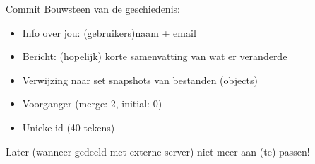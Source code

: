 \begin{frame}{Commit}
	Bouwsteen van de geschiedenis:
	\begin{itemize}
		\item Info over jou: (gebruikers)naam + email
		\item Bericht: (hopelijk) korte samenvatting van wat er veranderde
		\item Verwijzing naar set snapshots van bestanden (objects)
		\item Voorganger (merge: 2, initial: 0)
		\item Unieke id (40 tekens)
	\end{itemize}
	\alert{Later (wanneer gedeeld met externe server) niet meer aan (te) passen!}
\end{frame}
